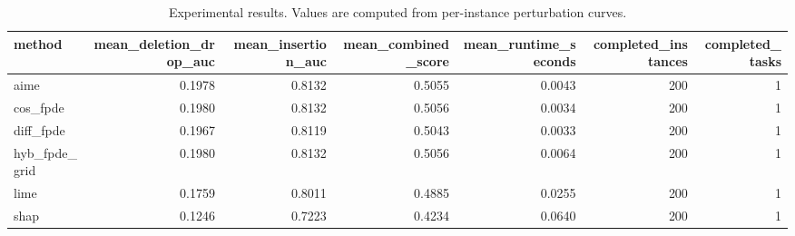 \begin{table}[t]
\caption{Experimental results. Values are computed from per-instance perturbation curves.}
\label{tab:main_results_computed}
\centering
\begin{tabular}{lrrrrrr}
\toprule
method & mean\_deletion\_drop\_auc & mean\_insertion\_auc & mean\_combined\_score & mean\_runtime\_seconds & completed\_instances & completed\_tasks \\
\midrule
aime & 0.1978 & 0.8132 & 0.5055 & 0.0043 & 200 & 1 \\
cos\_fpde & 0.1980 & 0.8132 & 0.5056 & 0.0034 & 200 & 1 \\
diff\_fpde & 0.1967 & 0.8119 & 0.5043 & 0.0033 & 200 & 1 \\
hyb\_fpde\_grid & 0.1980 & 0.8132 & 0.5056 & 0.0064 & 200 & 1 \\
lime & 0.1759 & 0.8011 & 0.4885 & 0.0255 & 200 & 1 \\
shap & 0.1246 & 0.7223 & 0.4234 & 0.0640 & 200 & 1 \\
\bottomrule
\end{tabular}

\end{table}
